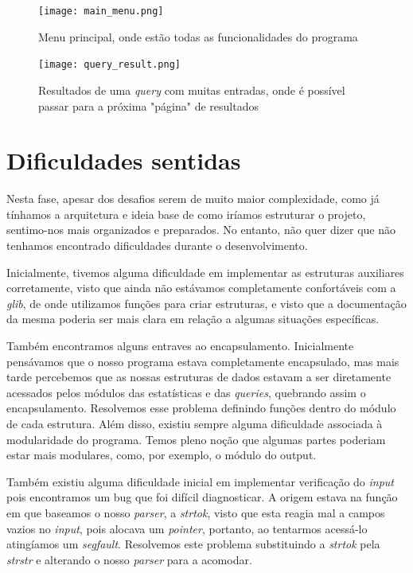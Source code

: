 \documentclass[12pt,a4paper]{report}
\begin{document}
    \begin{figure}[h]
    \texttt{[image: main\_menu.png]}
    \centering
    \caption{Menu principal, onde estão todas as funcionalidades do programa}
    \end{figure} 

    \begin{figure}[h]
    \texttt{[image: query\_result.png]}
    \centering
    \caption{Resultados de uma \textit{query} com muitas entradas, onde é possível passar para a próxima "página"  \space de resultados }
    \end{figure} 

\newpage

    \chapter{Dificuldades sentidas}

 	\par Nesta fase, apesar dos desafios serem de muito maior complexidade, como já tínhamos a arquitetura e ideia base de como iríamos estruturar o projeto, sentimo-nos mais organizados e preparados. No entanto, não quer dizer que não tenhamos encontrado dificuldades durante o desenvolvimento.
    \par Inicialmente, tivemos alguma dificuldade em implementar as estruturas auxiliares corretamente, visto que ainda não estávamos completamente confortáveis com a \textit{glib}, de onde utilizamos funções para criar estruturas, e visto que a documentação da mesma poderia ser mais clara em relação a algumas situações específicas.
    \par Também encontramos alguns entraves ao encapsulamento. Inicialmente pensávamos que o nosso programa estava completamente encapsulado, mas mais tarde percebemos que as nossas estruturas de dados estavam a ser diretamente acessados pelos módulos das estatísticas e das \textit{queries}, quebrando assim o encapsulamento. Resolvemos esse problema definindo funções dentro do módulo de cada estrutura. Além disso, existiu sempre alguma dificuldade associada à modularidade do programa. Temos pleno noção que algumas partes poderiam estar mais modulares, como, por exemplo, o módulo do output.
    \par Também existiu alguma dificuldade inicial em implementar verificação do \textit{input} pois encontramos um bug que foi difícil diagnosticar. A origem estava na função em que baseamos o nosso \textit{parser}, a \textit{strtok}, visto que esta reagia mal a campos vazios no \textit{input}, pois alocava um \textit{pointer}, portanto, ao tentarmos acessá-lo atingíamos um \textit{segfault}. Resolvemos este problema substituindo a \textit{strtok} pela \textit{strstr} e alterando o nosso \textit{parser} para a acomodar.
\end{document}
